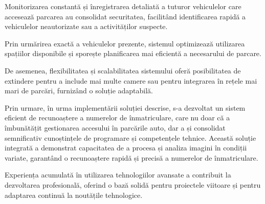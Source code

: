 \documentclass[a4paper,12pt]{report}
\begin{document}
Monitorizarea constantă și înregistrarea detaliată a tuturor vehiculelor care accesează parcarea au consolidat securitatea, facilitând identificarea rapidă a vehiculelor neautorizate sau a activităților suspecte.

Prin urmărirea exactă a vehiculelor prezente, sistemul optimizează utilizarea spațiilor disponibile și sporește planificarea mai eficientă a necesarului de parcare.

De asemenea, flexibilitatea și scalabilitatea sistemului oferă posibilitatea de extindere pentru a include mai multe camere sau pentru integrarea în rețele mai mari de parcări, furnizând o soluție adaptabilă.

Prin urmare, în urma implementării soluției descrise, s-a dezvoltat un sistem eficient de recunoaștere a numerelor de înmatriculare, care nu doar că a îmbunătățit gestionarea accesului în parcările auto, dar a și consolidat semnificativ cunoștințele de programare și competențele tehnice. Această soluție integrată a demonstrat capacitatea de a procesa și analiza imagini în condiții variate, garantând o recunoaștere rapidă și precisă a numerelor de înmatriculare.

Experiența acumulată în utilizarea tehnologiilor avansate a contribuit la dezvoltarea profesională, oferind o bază solidă pentru proiectele viitoare și pentru adaptarea continuă la noutățile tehnologice.
\end{document}
